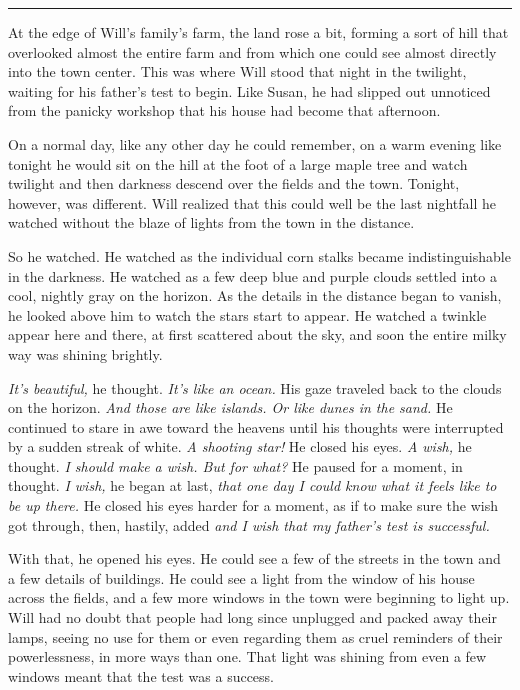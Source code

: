 \documentclass[12pt,letterpaper,oneside,english]{book}
\begin{document}
\medskip
{\centering\rule{\linewidth}{1pt}}
\smallskip

At the edge of Will's family's farm, the land rose a bit, forming a sort
of hill that overlooked almost the entire farm and from which one could
see almost directly into the town center. This was where Will stood that
night in the twilight, waiting for his father's test to begin. Like Susan,
he had slipped out unnoticed from the panicky workshop that his house had
become that afternoon.

On a normal day, like any other day he could remember, on a warm evening
like tonight he would sit on the hill at the foot of a large maple tree
and watch twilight and then darkness descend over the fields and the town.
Tonight, however, was different. Will realized that this could well be the
last nightfall he watched without the blaze of lights from the town in the
distance.

So he watched. He watched as the individual corn stalks became
indistinguishable in the darkness. He watched as a few deep blue and
purple clouds settled into a cool, nightly gray on the horizon. As the
details in the distance began to vanish, he looked above him to watch the
stars start to appear. He watched a twinkle appear here and there, at
first scattered about the sky, and soon the entire milky way was shining
brightly.

\textit{It's beautiful,} he thought. \textit{It's like an ocean.} His gaze
traveled back to the clouds on the horizon. \textit{And those are like
islands. Or like dunes in the sand.} He continued to stare in awe toward
the heavens until his thoughts were interrupted by a sudden streak of
white. \textit{A shooting star!} He closed his eyes. \textit{A wish,} he
thought. \textit{I should make a wish. But for what?} He paused for a
moment, in thought. \textit{I wish,} he began at last, \textit{that one
day I could know what it feels like to be up there.} He closed his eyes
harder for a moment, as if to make sure the wish got through, then,
hastily, added \textit{and I wish that my father's test is successful.}

With that, he opened his eyes. He could see a few of the streets in the
town and a few details of buildings. He could see a light from the window
of his house across the fields, and a few more windows in the town were
beginning to light up. Will had no doubt that people had long since
unplugged and packed away their lamps, seeing no use for them or even
regarding them as cruel reminders of their powerlessness, in more ways
than one. That light was shining from even a few windows meant that the
test was a success.
\end{document}
